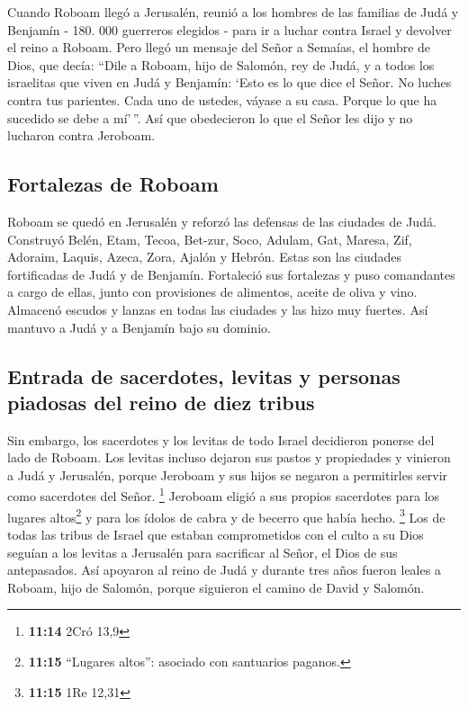  Cuando Roboam llegó a Jerusalén, reunió a los hombres de
las familias de Judá y Benjamín - 180. 000 guerreros elegidos - para ir
a luchar contra Israel y devolver el reino a Roboam.  Pero
llegó un mensaje del Señor a Semaías, el hombre de Dios, que decía:
 ``Dile a Roboam, hijo de Salomón, rey de Judá, y a todos
los israelitas que viven en Judá y Benjamín:  `Esto es lo
que dice el Señor. No luches contra tus parientes. Cada uno de ustedes,
váyase a su casa. Porque lo que ha sucedido se debe a mí'\,''. Así que
obedecieron lo que el Señor les dijo y no lucharon contra Jeroboam.

\hypertarget{fortalezas-de-roboam}{%
\subsection{Fortalezas de Roboam}\label{fortalezas-de-roboam}}

 Roboam se quedó en Jerusalén y reforzó las defensas de
las ciudades de Judá.  Construyó Belén, Etam, Tecoa,
 Bet-zur, Soco, Adulam,  Gat, Maresa, Zif,
 Adoraim, Laquis, Azeca,  Zora, Ajalón y
Hebrón. Estas son las ciudades fortificadas de Judá y de Benjamín.
 Fortaleció sus fortalezas y puso comandantes a cargo de
ellas, junto con provisiones de alimentos, aceite de oliva y vino.
 Almacenó escudos y lanzas en todas las ciudades y las
hizo muy fuertes. Así mantuvo a Judá y a Benjamín bajo su dominio.

\hypertarget{entrada-de-sacerdotes-levitas-y-personas-piadosas-del-reino-de-diez-tribus}{%
\subsection{Entrada de sacerdotes, levitas y personas piadosas del reino
de diez
tribus}\label{entrada-de-sacerdotes-levitas-y-personas-piadosas-del-reino-de-diez-tribus}}

 Sin embargo, los sacerdotes y los levitas de todo Israel
decidieron ponerse del lado de Roboam.  Los levitas
incluso dejaron sus pastos y propiedades y vinieron a Judá y Jerusalén,
porque Jeroboam y sus hijos se negaron a permitirles servir como
sacerdotes del Señor. \footnote{\textbf{11:14} 2Cró 13,9}
 Jeroboam eligió a sus propios sacerdotes para los
lugares altos\footnote{\textbf{11:15} ``Lugares altos'': asociado con
  santuarios paganos.} y para los ídolos de cabra y de becerro que había
hecho. \footnote{\textbf{11:15} 1Re 12,31}  Los de todas
las tribus de Israel que estaban comprometidos con el culto a su Dios
seguían a los levitas a Jerusalén para sacrificar al Señor, el Dios de
sus antepasados.  Así apoyaron al reino de Judá y durante
tres años fueron leales a Roboam, hijo de Salomón, porque siguieron el
camino de David y Salomón.

